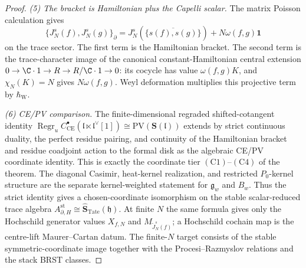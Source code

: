 \documentclass[11pt]{memoir}
\begin{document}
\begin{proof}
  \emph{(5) The bracket is Hamiltonian plus the Capelli scalar.}
  The matrix Poisson calculation gives
  \[
    \{J_N^s(f),J_N^s(g)\}_{\partial}
    =
    J_N^s\!\left(\overline{\{s(f),s(g)\}}\right)
    +N\omega(f,g)\mathbf1
  \]
  on the trace sector.  The first term is the Hamiltonian bracket.
  The second term is the trace-character image of the canonical
  constant-Hamiltonian central
  extension \(0\to\C\cdot1\to R\to R/\C\cdot1\to0\): its cocycle has
  value \(\omega(f,g)K\), and \(\chi_N(K)=N\) gives
  \(N\omega(f,g)\).  Weyl deformation multiplies this projective term
  by \(\hbar_{\mathrm W}\).

  \emph{(6) CE/PV comparison.}
  The finite-dimensional regraded shifted-cotangent identity
  \(\operatorname{Regr}_u
  C^\bullet_{\mathrm{CE}}(\mathfrak l\ltimes\mathfrak l^\vee[1])
  \cong \mathrm{PV}(\mathbf S(\mathfrak l))\) extends by strict
  continuous duality, the perfect residue pairing, and continuity of
  the Hamiltonian bracket and residue coadjoint action to the formal
  disk as the algebraic CE/PV coordinate identity.  This is exactly the
  coordinate tier \(\mathrm{(C1)}\)--\(\mathrm{(C4)}\) of the theorem.
  The diagonal Casimir, heat-kernel realization, and restricted
  \(P_0\)-kernel structure are the separate kernel-weighted statement
  for \(\mathfrak g_w\) and \(B_w\).  Thus the strict identity gives a
  chosen-coordinate isomorphism on the
  stable scalar-reduced trace algebra
  \(A_{\partial,H}^{\mathrm{st}}\cong
  \widehat{\mathbf S}_{\mathrm{Tate}}(\mathfrak h)\).  At finite \(N\)
  the same formula gives only the Hochschild generator values
  \(X_{f,N}\) and \(M_{\widetilde J_N^s(f)}\); a Hochschild cochain map is the
  centre-lift Maurer--Cartan datum.  The finite-\(N\) target consists of
  the stable symmetric-coordinate image together with the
  Procesi--Razmyslov relations and the stack BRST classes.


\end{proof}
\end{document}
